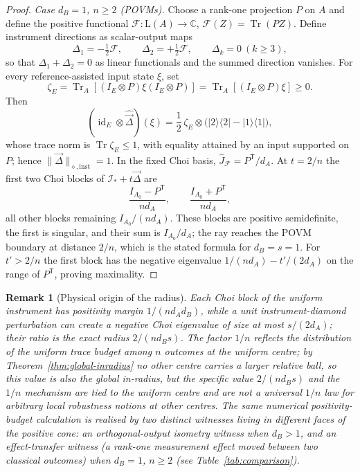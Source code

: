 \documentclass[11pt,a4paper]{article}
\newtheorem{remark}[theorem]{Remark}
\newcommand{\Lin}{\mathrm{L}}
\newcommand{\Tr}{\operatorname{Tr}}
\newcommand{\id}{\operatorname{id}}
\newcommand{\Jhat}{\widehat J}
\newcommand{\vD}{\vec{\Delta}}
\begin{document}
\begin{proof}
\emph{Case $d_B=1$, $n\ge2$ (POVMs).} Choose a rank-one projection $P$ on $A$ and define the positive functional $\mathcal F:\Lin(A)\to\mathbb C$, $\mathcal F(Z)=\Tr(PZ)$. Define instrument directions as scalar-output maps
\[
\Delta_1=-\tfrac12\mathcal F,\qquad \Delta_2=+\tfrac12\mathcal F,\qquad \Delta_k=0\ (k\ge3),
\]
so that $\Delta_1+\Delta_2=0$ as linear functionals and the summed direction vanishes. For every reference-assisted input state $\xi$, set
\[
\zeta_E=\Tr_A[(I_E\otimes P)\xi(I_E\otimes P)]=\Tr_A[(I_E\otimes P)\xi]\ge0.
\]
Then
\[
(\id_E\otimes\widehat{\vD})(\xi)
=\frac12\,\zeta_E\otimes\big(|2\rangle\langle2|-|1\rangle\langle1|\big),
\]
whose trace norm is $\Tr\zeta_E\le1$, with equality attained by an input supported on $P$; hence $\|\vD\|_{\diamond,\mathrm{inst}}=1$. In the fixed Choi basis, $\Jhat_{\mathcal F}=P^{\mathsf T}/d_A$. At $t=2/n$ the first two Choi blocks of $\mathcal I_*+t\vD$ are
\[
\frac{I_{A_0}-P^{\mathsf T}}{nd_A},\qquad
\frac{I_{A_0}+P^{\mathsf T}}{nd_A},
\]
all other blocks remaining $I_{A_0}/(nd_A)$. These blocks are positive semidefinite, the first is singular, and their sum is $I_{A_0}/d_A$; the ray reaches the POVM boundary at distance $2/n$, which is the stated formula for $d_B=s=1$. For $t'>2/n$ the first block has the negative eigenvalue $1/(nd_A)-t'/(2d_A)$ on the range of $P^{\mathsf T}$, proving maximality.
\end{proof}

\begin{remark}[Physical origin of the radius]
\label{rem:physical-origin}
Each Choi block of the uniform instrument has positivity margin $1/(nd_Ad_B)$, while a unit instrument-diamond perturbation can create a negative Choi eigenvalue of size at most $s/(2d_A)$; their ratio is the exact radius $2/(nd_Bs)$. The factor $1/n$ reflects the distribution of the uniform trace budget among $n$ outcomes \emph{at the uniform centre}; by Theorem~\ref{thm:global-inradius} no other centre carries a larger relative ball, so this value is also the global in-radius, but the specific value $2/(nd_Bs)$ and the $1/n$ mechanism are tied to the uniform centre and are not a universal $1/n$ law for arbitrary local robustness notions at other centres. The same numerical positivity-budget calculation is realised by two \emph{distinct} witnesses living in different faces of the positive cone: an orthogonal-output isometry witness when $d_B>1$, and an effect-transfer witness (a rank-one measurement effect moved between two classical outcomes) when $d_B=1$, $n\ge2$ (see Table~\ref{tab:comparison}).
\end{remark}
\end{document}

